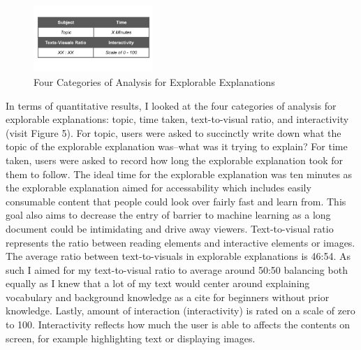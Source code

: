 \documentclass[10pt,twocolumn]{article}
\begin{document}
\begin{figure}[h]
\caption{Four Categories of Analysis for Explorable Explanations}
\centering
\includegraphics[width=0.4\textwidth]{./Images/categoriesOfAnalysis.pdf}
\end{figure}

In terms of quantitative results, I looked at the four categories of analysis for explorable explanations: topic, time taken, text-to-visual ratio, and interactivity (visit Figure 5). For topic, users were asked to succinctly write down what the topic of the explorable explanation was--what was it trying to explain? For time taken, users were asked to record how long the explorable explanation took for them to follow. The ideal time for the explorable explanation was ten minutes as the explorable explanation aimed for accessability which includes easily consumable content that people could look over fairly fast and learn from. This goal also aims to decrease the entry of barrier to machine learning as a long document could be intimidating and drive away viewers. Text-to-visual ratio represents the ratio between reading elements and interactive elements or images. The average ratio between text-to-visuals in explorable explanations is 46:54. As such I aimed for my text-to-visual ratio to average around 50:50 balancing both equally as I knew that a lot of my text would center around explaining vocabulary and background knowledge as a cite for beginners without prior knowledge. Lastly, amount of interaction (interactivity) is rated on a scale of zero to 100. Interactivity reflects how much the user is able to affects the contents on screen, for example highlighting text or displaying images. \cite{ExplorableExplanation}
\end{document}
